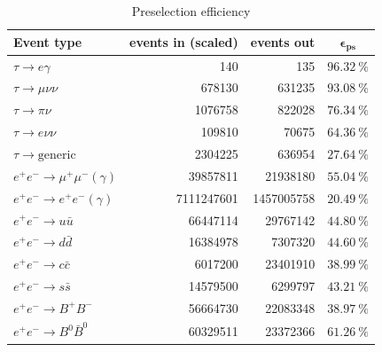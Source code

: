 \documentclass[12pt]{thesis}  %
\begin{document}
\begin{table}[h]
\centering
\begin{tabular}{lrrc}
\textbf{Event type}         & \textbf{events in (scaled)} & \textbf{events out} & $\mathbf{\epsilon_{\text{ps}}}$ \\ \hline 
\rowcolor[HTML]{EFEFEF} 
$\tau\to e\gamma$       & \num{140}        & \num{135}      & $\SI{96.32}{\percent}$                   \\
$\tau\to\mu\nu\nu$      & \num{678130}         & \num{631235}          & $\SI{93.08}{\percent}$           \\
$\tau\to\pi\nu$         & \num{1076758}       & \num{822028}          & $\SI{76.34}{\percent}$            \\
$\tau\to e\nu\nu$       & \num{109810}        & \num{70675}         & $\SI{64.36}{\percent}$      \\
$\tau\to\text{generic}$  & \num{2304225}       & \num{636954}          & $\SI{27.64}{\percent}$         \\
$e^+ e^- \to \mu^+ \mu^- (\gamma)$   & \num{39857811}    & \num{21938180}     & $\SI{55.04}{\percent}$   \\
$e^+ e^- \to e^+ e^- (\gamma)$      & \num{7111247601}      & \num{1457005758}       & $\SI{20.49}{\percent}$     \\
$e^+ e^- \to u \bar{u}$       & \num{66447114}           & \num{29767142}  & $\SI{44.80}{\percent}$ \\
$e^+ e^- \to d \bar{d}$        & \num{16384978}       & \num{7307320}      & $\SI{44.60}{\percent}$       \\
$e^+ e^- \to c \bar{c}$        & \num{6017200}       & \num{23401910}           & $\SI{38.99}{\percent}$          \\
$e^+ e^- \to s \bar{s}$       & \num{14579500}     & \num{6299797}            & $\SI{43.21}{\percent}$         \\
$e^+ e^- \to B^+ B^-$     & \num{56664730}       & \num{22083348}           & $\SI{38.97}{\percent}$          \\
$e^+ e^- \to B^0 \bar{B}^0$       & \num{60329511}           & \num{23372366}        & $\SI{61.26}{\percent}$              
\end{tabular}
\caption{Preselection efficiency}
\label{my-label}
\end{table}

\pagebreak

\end{document}
